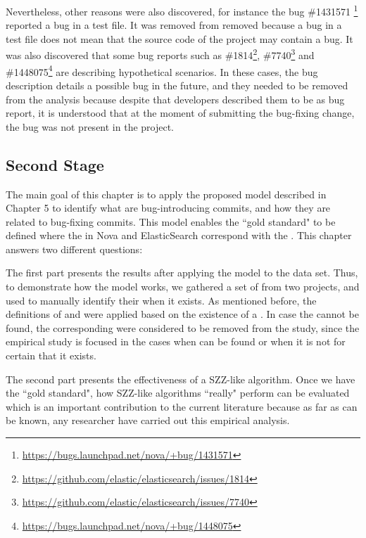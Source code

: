 \documentclass[a4paper, 12pt]{book}
\begin{document}
Nevertheless, other reasons were also discovered, for instance the bug \#1431571 \footnote{\url{https://bugs.launchpad.net/nova/+bug/1431571}} reported a bug in a test file. It was removed from removed  because a bug in a test file does not mean that the source code of the project may contain a bug. It was also discovered that some bug reports such as \#1814\footnote{\url{https://github.com/elastic/elasticsearch/issues/1814}}, \#7740\footnote{\url{https://github.com/elastic/elasticsearch/issues/7740}} and \#1448075\footnote{\url{https://bugs.launchpad.net/nova/+bug/1448075}} are describing hypothetical scenarios. In these cases, the bug description details a possible bug in the future, and they needed to be  removed from the analysis because despite that developers described them to be as bug report, it is understood that at the moment of submitting the bug-fixing change, the bug was not present in the project. 

\subsection{Second Stage}
\label{sec:resultsSS}

The main goal of this chapter is to apply the proposed model described in Chapter 5 to identify what are bug-introducing commits, and how they are related to bug-fixing commits. This model enables the ``gold standard" to be defined where the \BIC in Nova and ElasticSearch correspond with the \BFC. This chapter answers two different questions:

The first part presents the results after applying the model to the data set. Thus, to demonstrate how the model works, we gathered a set of \BFC from two projects, and used to manually identify their \BIC when it exists. As mentioned before, the definitions of \BIC and \BFC were applied based on the existence of a \TSB. In case the \BIC cannot be found, the corresponding \BFC were considered to be removed from the study, since the empirical study is focused in the cases when \BIC can be found or when it is not for certain that it exists.  

The second part presents the effectiveness of a SZZ-like algorithm. Once we have the ``gold standard", how SZZ-like algorithms ``really" perform  can be evaluated which is an important contribution to the current literature because as far as can be known, any researcher have carried out this empirical analysis. 
\end{document}
